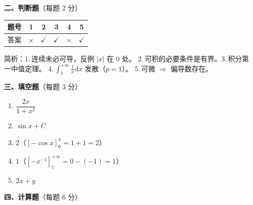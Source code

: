 \documentclass[12pt]{ctexart}
\begin{document}
\vspace{10pt}
\noindent\textbf{二、判断题}（每题 2 分）\par\vspace{4pt}
\begin{center}
\renewcommand{\arraystretch}{1.3}
\begin{tabular}{|c|c|c|c|c|c|}
\hline
题号 & 1 & 2 & 3 & 4 & 5 \\\hline
答案 & $\times$ & $\checkmark$ & $\checkmark$ & $\times$ & $\checkmark$ \\\hline
\end{tabular}
\end{center}
\noindent\small 简析：1.\,连续未必可导，反例 $|x|$ 在 $0$ 处。
2.\,可积的必要条件是有界。3.\,积分第一中值定理。
4.\,$\int_{1}^{+\infty}\frac1x\mathrm{d}x$ 发散（$p=1$）。
5.\,可微 $\Rightarrow$ 偏导数存在。\normalsize

\vspace{10pt}
\noindent\textbf{三、填空题}（每题 3 分）\par\vspace{4pt}
\begin{enumerate}[label=\arabic*.,itemsep=4pt]
\item $\dfrac{2x}{1+x^{2}}$ \qquad
\item $\sin x+C$ \qquad
\item $2$（$[-\cos x]_{0}^{\pi}=1+1=2$）
\item $1$（$[-x^{-1}]_{1}^{+\infty}=0-(-1)=1$）
\item $2x+y$
\end{enumerate}

\vspace{6pt}
\noindent\textbf{四、计算题}（每题 6 分）
\end{document}
